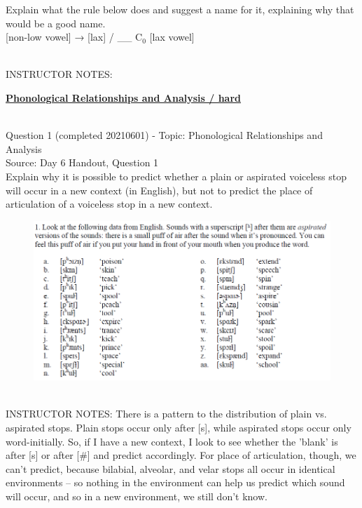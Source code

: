 \documentclass[12pt]{article}
\begin{document}
Explain what the rule below does and suggest a name for it, explaining why that would be a good name.\\

{[non-low vowel]} →  {[lax]} / \_\_ C$_0$ {[lax vowel]}


~\\
INSTRUCTOR NOTES: 


\newpage\textbf{\underline{\huge Phonological Relationships and Analysis / hard\\}}

~\\

{\large Question 1} (completed 20210601) - Topic: Phonological Relationships and Analysis\\
Source: Day 6 Handout, Question 1\\

Explain why it is possible to predict whether a plain or aspirated voiceless stop will occur in a new context (in English), but not to predict the place of articulation of a voiceless stop in a new context.\\

\begin{figure}[H]
\includegraphics{../images/aspiration.png}
\end{figure}

~\\
INSTRUCTOR NOTES: There is a pattern to the distribution of plain vs. aspirated stops. Plain stops occur only after [s], while aspirated stops occur only word-initially. So, if I have a new context, I look to see whether the 'blank' is after [s] or after [\#] and predict accordingly. For place of articulation, though, we can't predict, because bilabial, alveolar, and velar stops all occur in identical environments -- so nothing in the environment can help us predict which sound will occur, and so in a new environment, we still don't know.
\end{document}
